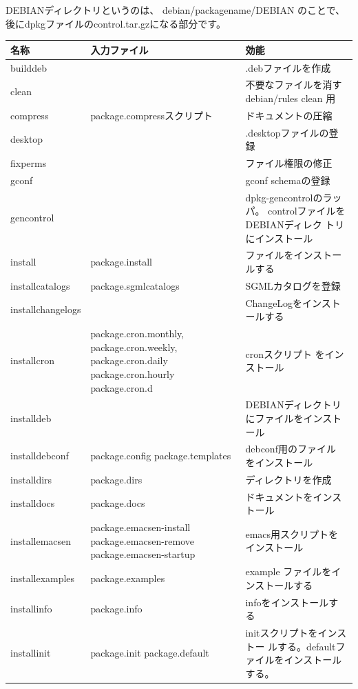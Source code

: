 \documentclass[mingoth]{jsarticle}
\begin{document}
DEBIANディレクトリというのは、
debian/packagename/DEBIAN
のことで、後にdpkgファイルのcontrol.tar.gzになる部分です。



\begin{longtable}{|p{3cm}|p{7cm}|p{5cm}|}
\hline
\hline
名称 & 入力ファイル & 効能\\
\hline
\hline
builddeb & & .debファイルを作成 \\
\hline
clean & & 不要なファイルを消す debian/rules clean 用 \\
\hline
compress & package.compressスクリプト & ドキュメントの圧縮 \\
\hline
desktop & & .desktopファイルの登録\\
\hline
fixperms & & ファイル権限の修正\\
\hline
gconf & & gconf schemaの登録 \\
\hline
gencontrol & & dpkg-gencontrolのラッパ。 controlファイルをDEBIANディレク
 トリにインストール \\
\hline
install & package.install & ファイルをインストールする \\
\hline
installcatalogs & package.sgmlcatalogs & SGMLカタログを登録 \\
\hline
installchangelogs & & ChangeLogをインストールする \\
\hline
installcron & package.cron.monthly, package.cron.weekly,
 package.cron.daily package.cron.hourly package.cron.d  & cronスクリプト
 をインストール \\
\hline
installdeb & & DEBIANディレクトリにファイルをインストール \\
\hline
installdebconf & package.config package.templates & debconf用のファイル
 をインストール \\
\hline
installdirs & package.dirs & ディレクトリを作成 \\
\hline
installdocs & package.docs & ドキュメントをインストール \\
\hline
installemacsen & package.emacsen-install package.emacsen-remove
 package.emacsen-startup & emacs用スクリプトをインストール \\
\hline
installexamples & package.examples & example ファイルをインストールする \\
\hline
installinfo & package.info & infoをインストールする \\
\hline
installinit & package.init package.default & initスクリプトをインストー
 ルする。defaultファイルをインストールする。 \\

\end{longtable}
\end{document}
